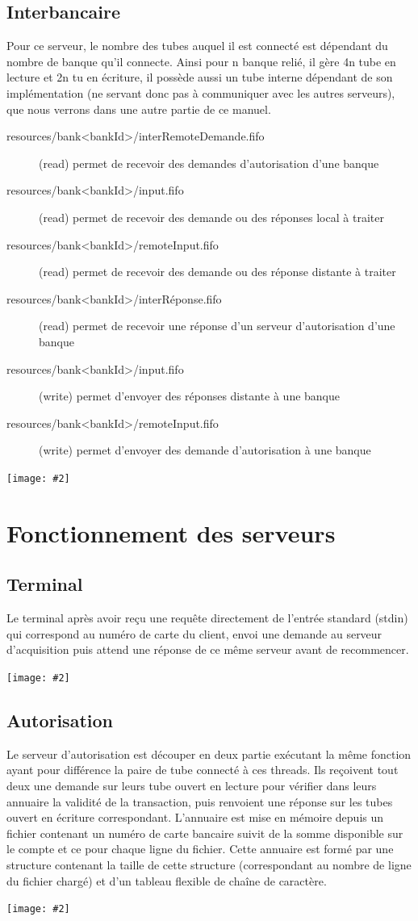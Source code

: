\documentclass[french, a4paper, 12pt, titlepage]{article}
\newcommand{\graph}[2]{
\medskip
	\begin{center}
		\texttt{[image: \#2]}
	\end{center}
\medskip
}
\begin{document}
\subsection{Interbancaire}
Pour ce serveur, le nombre des tubes auquel il est connecté est dépendant du nombre de banque qu'il connecte.
Ainsi pour n banque relié, il gère 4n tube en lecture et 2n tu en écriture, il possède aussi un tube interne dépendant de son implémentation (ne servant donc pas à communiquer avec les autres serveurs), que nous verrons dans une autre partie de ce manuel.

\begin{description}
	\item[resources/bank<bankId>/interRemoteDemande.fifo] (read) permet de recevoir des demandes d'autorisation d'une banque
	\item[resources/bank<bankId>/input.fifo] (read) permet de recevoir des demande ou des réponses local à traiter
	\item[resources/bank<bankId>/remoteInput.fifo] (read) permet de recevoir des demande ou des réponse distante à traiter
	\item[resources/bank<bankId>/interRéponse.fifo] (read) permet de recevoir une réponse d'un serveur d'autorisation d'une banque
	\item[resources/bank<bankId>/input.fifo] (write) permet d'envoyer des réponses distante à une banque
	\item[resources/bank<bankId>/remoteInput.fifo] (write) permet d'envoyer des demande d'autorisation à une banque
\end{description}
\graph{0.5}{interbancaire}

\section{Fonctionnement des serveurs}
\subsection{Terminal}
Le terminal après avoir reçu une requête directement de l'entrée standard (stdin) qui correspond au numéro de carte du client, envoi une demande au serveur d'acquisition puis attend une réponse de ce même serveur avant de recommencer.
\graph{0.4}{terminalState}

\subsection{Autorisation}
Le serveur d'autorisation est découper en deux partie exécutant la même fonction ayant pour différence la paire de tube connecté à ces threads.
Ils reçoivent tout deux une demande sur leurs tube ouvert en lecture pour vérifier dans leurs annuaire la validité de la transaction, puis renvoient une réponse sur les tubes ouvert en écriture correspondant.
L'annuaire est mise en mémoire depuis un fichier contenant un numéro de carte bancaire suivit de la somme disponible sur le compte et ce pour chaque ligne du fichier.
Cette annuaire est formé par une structure contenant la taille de cette structure (correspondant au nombre de ligne du fichier chargé) et d'un tableau flexible de chaîne de caractère.
\graph{0.4}{autorisationState}
\end{document}
